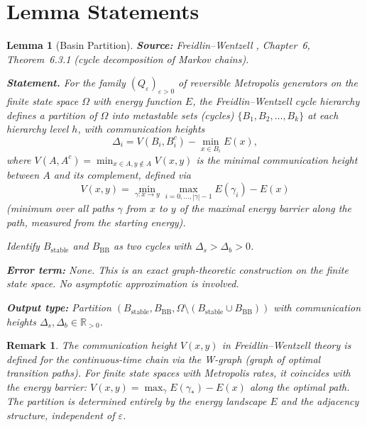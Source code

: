 \documentclass[11pt]{article}
\newtheorem{lemma}{Lemma}
\newtheorem{remark}{Remark}
\newcommand{\eps}{\varepsilon}
\newcommand{\Ds}{\Delta_s}
\newcommand{\Db}{\Delta_b}
\newcommand{\Bstable}{B_{\mathrm{stable}}}
\newcommand{\BBB}{B_{\mathrm{BB}}}
\begin{document}
\section{Lemma Statements}

\begin{lemma}[Basin Partition]\label{lem:partition}
\textbf{Source:} Freidlin--Wentzell \cite{FW12}, Chapter~6,
Theorem~6.3.1 (cycle decomposition of Markov chains).

\medskip
\textbf{Statement.}
For the family $(Q_\eps)_{\eps > 0}$ of reversible Metropolis generators
on the finite state space $\Omega$ with energy function $E$,
the Freidlin--Wentzell cycle hierarchy defines a partition of $\Omega$
into metastable sets (cycles) $\{B_1, B_2, \ldots, B_k\}$ at
each hierarchy level $h$, with communication heights
\[
  \Delta_i = V(B_i, B_i^c) - \min_{x \in B_i} E(x),
\]
where $V(A, A^c) = \min_{x \in A, y \notin A}
V(x,y)$ is the minimal communication height between $A$ and its
complement, defined via
\[
  V(x,y) = \min_{\gamma: x \to y} \max_{i=0,\ldots,|\gamma|-1}
  E(\gamma_i) - E(x)
\]
(minimum over all paths $\gamma$ from $x$ to $y$ of the maximal
energy barrier along the path, measured from the starting energy).

Identify $\Bstable$ and $\BBB$ as two cycles with
$\Ds > \Db > 0$.

\medskip
\textbf{Error term:} None.
This is an exact graph-theoretic construction on the finite state space.
No asymptotic approximation is involved.

\medskip
\textbf{Output type:}
Partition $(\Bstable, \BBB, \Omega \setminus (\Bstable \cup \BBB))$
with communication heights $\Ds, \Db \in \mathbb{R}_{>0}$.
\end{lemma}

\begin{remark}
The communication height $V(x,y)$ in Freidlin--Wentzell theory is
defined for the continuous-time chain via the W-graph (graph of
optimal transition paths). For finite state spaces with Metropolis
rates, it coincides with the energy barrier: $V(x,y) = \max_\gamma
E(\gamma_*) - E(x)$ along the optimal path. The partition is
determined entirely by the energy landscape $E$ and the adjacency
structure, independent of $\eps$.
\end{remark}
\end{document}

